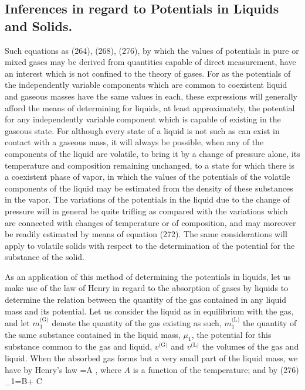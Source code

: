 \documentclass[12pt]{memoir}
\begin{document}
\subsection{Inferences in regard to Potentials in Liquids and Solids.}
Such equations as (264), (268), (276), by which the values of potentials in pure or mixed gases may be derived from quantities capable of direct measurement, have an interest which is not confined to the theory of gases. For as the potentials of the independently variable components which are common to coexistent liquid and gaseous masses have the same values in each, these expressions will generally afford the means of determining for liquids, at least approximately, the potential for any independently variable component which is capable of existing in the gaseous state. For although every state of a liquid is not such as can exist in contact with a gaseous mass, it will always be possible, when any of the components of the liquid are volatile, to bring it by a change of pressure alone, its temperature and composition remaining unchanged, to a state for which there is a coexistent phase of vapor, in which the values of the potentials of the volatile components of the liquid may be estimated from the density of these substances in the vapor. The variations of the potentials in the liquid due to the change of pressure will in general be quite trifling as compared with the variations which are connected with changes of temperature or of composition, and may moreover be readily estimated by means of equation (272). The same considerations will apply to volatile solids with respect to the determination of the potential for the substance of the solid.


As an application of this method of determining the potentials in liquids, let us make use of the law of Henry in regard to the absorption of gases by liquids to determine the relation between the quantity of the gas contained in any liquid mass and its potential. Let us consider the liquid as in equilibrium with the gas, and let $m_1^\text{(G)}$ denote the quantity of the gas existing as such, $m_1^\text{(L)}$ the quantity of the same substance contained in the liquid mass, $\mu_1$, the potential for this substance common to the gas and liquid, $v^\text{(G)}$ and $v^\text{(L)}$ the volumes of the gas and liquid. When the absorbed gas forms but a very small part of the liquid mass, we have by Henry's law
\eqs {}=A ,      \label{294}\eqe
where $A$ is a function of the temperature; and by (276)
\eqs \mu_1=B+ C \log {}   \label{295}\eqe
\end{document}
